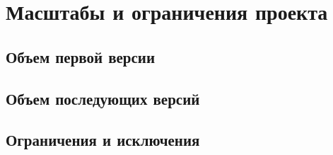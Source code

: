\chapter{Масштабы и ограничения проекта}
\label{ch:chap3}


\section{Объем первой версии}
\label{sec:mvp}


\section{Объем последующих версий}
\label{sec:next}


\section{Ограничения и исключения}
\label{sec:restrictions}

\endinput
